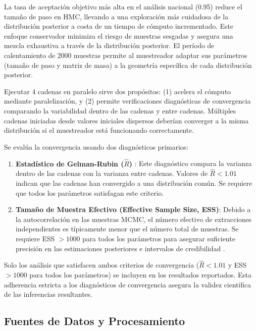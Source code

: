 La tasa de aceptación objetivo más alta en el análisis nacional (0.95) reduce el tamaño de paso en HMC, llevando a una exploración más cuidadosa de la distribución posterior a costa de un tiempo de cómputo incrementado. Este enfoque conservador minimiza el riesgo de muestras sesgadas y asegura una mezcla exhaustiva a través de la distribución posterior. El período de calentamiento de 2000 muestras permite al muestreador adaptar sus parámetros (tamaño de paso y matriz de masa) a la geometría específica de cada distribución posterior.

Ejecutar 4 cadenas en paralelo sirve dos propósitos: (1) acelera el cómputo mediante paralelización, y (2) permite verificaciones diagnósticas de convergencia comparando la variabilidad dentro de las cadenas y entre cadenas. Múltiples cadenas iniciadas desde valores iniciales dispersos deberían converger a la misma distribución si el muestreador está funcionando correctamente.

Se evalúa la convergencia usando dos diagnósticos primarios:

\begin{enumerate}
    \item \textbf{Estadístico de Gelman-Rubin ($\hat{R}$)} \cite{gelman1992inference}: Este diagnóstico compara la varianza dentro de las cadenas con la varianza entre cadenas. Valores de $\hat{R} < 1.01$ indican que las cadenas han convergido a una distribución común. Se requiere que todos los parámetros satisfagan este criterio.

    \item \textbf{Tamaño de Muestra Efectivo (Effective Sample Size, ESS)}: Debido a la autocorrelación en las muestras MCMC, el número efectivo de extracciones independientes es típicamente menor que el número total de muestras. Se requiere ESS $> 1000$ para todos los parámetros para asegurar suficiente precisión en las estimaciones posteriores e intervalos de credibilidad \cite{gelman2013bayesian}.
\end{enumerate}

Solo los análisis que satisfacen ambos criterios de convergencia ($\hat{R} < 1.01$ y ESS $> 1000$ para todos los parámetros) se incluyen en los resultados reportados. Esta adherencia estricta a los diagnósticos de convergencia asegura la validez científica de las inferencias resultantes.

\subsection{Fuentes de Datos y Procesamiento}

